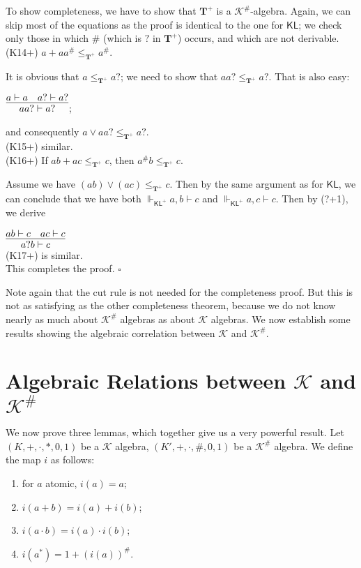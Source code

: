 \documentclass{eptcs}
\newcommand{\proofend}{\hfill $\square$}
\newcommand{\KA}{\mathcal{K}}
\newcommand{\KL}{\mathsf{KL}}
\begin{document}
To show completeness, we have to show that $\textbf{T}^+$
is a $\KA^\#$-algebra. 
Again, we can skip  most of the equations as the proof is
identical to the one for $\KL$;
we check only those in which $\#$ (which is $?$ in $\textbf{T}^+$)
occurs, and which are not derivable. 
\\

(K14+) $a+aa^\#\leq_{\textbf{T}^+} a^\#$. 

It is obvious that $a\leq_{\textbf{T}^+} a?$; we need to show that 
$aa?\leq_{\textbf{T}^+} a?$. That is also easy:

$\infer{aa?\vdash a?}{a\vdash a & a?\vdash a?}$; 

and consequently
$a\vee aa?\leq_{\textbf{T}^+} a?$.
\\

(K15+) similar.
\\

(K16+) If $ab+ac\leq_{\textbf{T}^+} c$, then $a^\#b\leq_{\textbf{T}^+} c$. 

Assume we have $(ab)\vee (ac)\leq_{\textbf{T}^+} c$. Then by the same
argument as for $\KL$, we can conclude that we have both
$\Vdash_{\KL^+}a,b\vdash c$ and $\Vdash_{\KL^+}a,c\vdash c$. 
Then by (?+1), we derive

$\infer{a?b\vdash c}
{ab\vdash c & ac\vdash c}$
\\

(K17+) is similar.
\\

This completes the proof.
\proofend

Note again that the cut rule is not needed for the completeness proof.
But this is not as satisfying as the other completeness theorem,
because we do not know nearly as much about $\KA^\#$ algebras
as about $\KA$ algebras. We now establish some results showing
the algebraic correlation between $\KA$ and $\KA^\#$.


\section{Algebraic Relations between $\KA$ and $\KA^\#$}

We now prove  three lemmas, which together give us a very 
powerful result. Let $(K,+,\cdot,*,0,1)$ be a $\KA$ algebra,
$(K',+,\cdot,\#,0,1)$ be a $\KA^\#$ algebra. We define the
map $i$ as follows: 
\begin{enumerate}
\item for $a$ atomic, $i(a)=a$;
\item $i(a+b)=i(a)+i(b)$;
\item $i(a\cdot b)=i(a)\cdot i(b)$;
\item $i(a^*)=1+(i(a))^\#$.
\end{enumerate}
\end{document}
